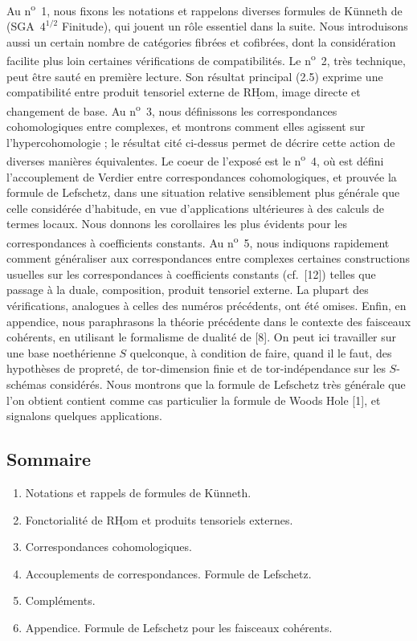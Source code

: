 \documentclass[11pt]{article}
\newcommand{\R}{\mathrm{R}}\newcommand{\RHomCore}{\mathrm{RHom}}
\providecommand{\RHom}{\RHomCore}
\providecommand{\uRHom}{\underline{\RHom}}
\providecommand{\RHom}{\RHomCore}
\providecommand{\RHom}{\R\mathcal{H}om}
\providecommand{\R}{\mathrm R}
\providecommand{\RHom}{\RHomCore}
\begin{document}
Au n\textsuperscript{o}~1, nous fixons les notations et rappelons diverses formules de Künneth de (SGA~$4^{1/2}$ Finitude), qui jouent un rôle essentiel dans la suite. Nous introduisons aussi un certain nombre de catégories fibrées et cofibrées, dont la considération facilite plus loin certaines vérifications de compatibilités. Le n\textsuperscript{o}~2, très technique, peut être sauté en première lecture. Son résultat principal (2.5) exprime une compatibilité entre produit tensoriel externe de $\uRHom$, image directe et changement de base. Au n\textsuperscript{o}~3, nous définissons les correspondances cohomologiques entre complexes, et montrons comment elles agissent sur l'hypercohomologie ; le résultat cité ci-dessus permet de décrire cette action de diverses manières équivalentes. Le coeur de l'exposé est le n\textsuperscript{o}~4, où est défini l'accouplement de Verdier entre correspondances cohomologiques, et prouvée la formule de Lefschetz, dans une situation relative sensiblement plus générale que celle considérée d'habitude, en vue d'applications ultérieures à des calculs de termes locaux. Nous donnons les corollaires les plus évidents pour les correspondances à coefficients constants. Au n\textsuperscript{o}~5, nous indiquons rapidement comment généraliser aux correspondances entre complexes certaines constructions usuelles sur les correspondances à coefficients constants (cf.~[12]) telles que passage à la duale, composition, produit tensoriel externe. La plupart des vérifications, analogues à celles des numéros précédents, ont été omises. Enfin, en appendice, nous paraphrasons la théorie précédente dans le contexte des faisceaux cohérents, en utilisant le formalisme de dualité de [8]. On peut ici travailler sur une base noethérienne $S$ quelconque, à condition de faire, quand il le faut, des hypothèses de propreté, de tor-dimension finie et de tor-indépendance sur les $S$-schémas considérés. Nous montrons que la formule de Lefschetz très générale que l'on obtient contient comme cas particulier la formule de Woods Hole [1], et signalons quelques applications.

\subsection*{Sommaire}
\begin{enumerate}[label=\arabic*.]
\item Notations et rappels de formules de Künneth.
\item Fonctorialité de $\uRHom$ et produits tensoriels externes.
\item Correspondances cohomologiques.
\item Accouplements de correspondances. Formule de Lefschetz.
\item Compléments.
\item Appendice. Formule de Lefschetz pour les faisceaux cohérents.
\end{enumerate}
\end{document}
